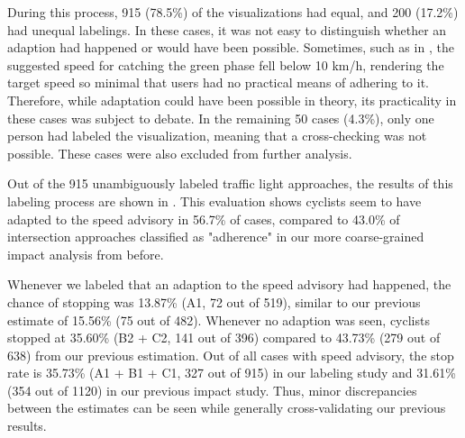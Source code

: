 During this process, 915 (78.5\%) of the visualizations had equal, and 200 (17.2\%) had unequal labelings. In these cases, it was not easy to distinguish whether an adaption had happened or would have been possible. Sometimes, such as in , the suggested speed for catching the green phase fell below 10 km/h, rendering the target speed so minimal that users had no practical means of adhering to it. Therefore, while adaptation could have been possible in theory, its practicality in these cases was subject to debate. In the remaining 50 cases (4.3\%), only one person had labeled the visualization, meaning that a cross-checking was not possible. These cases were also excluded from further analysis.

\begin{table}[!b]
\centering
{}
\caption{Results from labeling the visualized traffic light approaches, such as highlighted in  and . Labelings that were not confirmed by all two persons are omitted in this table.}
\label{tab:impacts-labeling-results}
\end{table}

Out of the 915 unambiguously labeled traffic light approaches, the results of this labeling process are shown in . This evaluation shows cyclists seem to have adapted to the speed advisory in 56.7\% of cases, compared to 43.0\% of intersection approaches classified as "adherence" in our more coarse-grained impact analysis from before. 

Whenever we labeled that an adaption to the speed advisory had happened, the chance of stopping was 13.87\% (A1, 72 out of 519), similar to our previous estimate of 15.56\% (75 out of 482). Whenever no adaption was seen, cyclists stopped at 35.60\% (B2 + C2, 141 out of 396) compared to 43.73\% (279 out of 638) from our previous estimation. Out of all cases with speed advisory, the stop rate is 35.73\% (A1 + B1 + C1, 327 out of 915) in our labeling study and 31.61\% (354 out of 1120) in our previous impact study. Thus, minor discrepancies between the estimates can be seen while generally cross-validating our previous results. 

